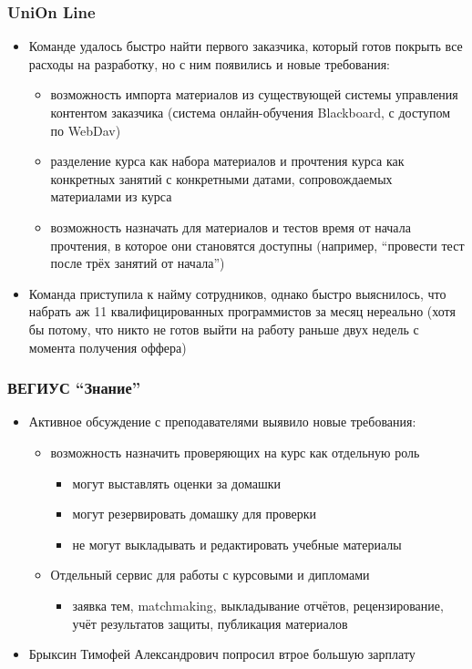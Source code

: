 \documentclass[xetex,mathserif,serif]{beamer}
\begin{document}
	\begin{frame}
		\frametitle{UniOn Line}
		\begin{itemize}
			\item Команде удалось быстро найти первого заказчика, который готов покрыть все расходы на разработку, но с ним появились и новые требования:
			\begin{itemize}
				\item возможность импорта материалов из существующей системы управления контентом заказчика (система онлайн-обучения Blackboard, с доступом по WebDav)
				\item разделение курса как набора материалов и прочтения курса как конкретных занятий с конкретными датами, сопровождаемых материалами из курса
				\item возможность назначать для материалов и тестов время от начала прочтения, в которое они становятся доступны (например, ``провести тест после трёх занятий от начала'')
			\end{itemize}
			\item Команда приступила к найму сотрудников, однако быстро выяснилось, что набрать аж 11 квалифицированных программистов за месяц нереально (хотя бы потому, что никто не готов выйти на работу раньше двух недель с момента получения оффера)
		\end{itemize}
	\end{frame}

	\begin{frame}
		\frametitle{ВЕГИУС ``Знание''}
		\begin{itemize}
			\item Активное обсуждение с преподавателями выявило новые требования:
			\begin{itemize}
				\item возможность назначить проверяющих на курс как отдельную роль
				\begin{itemize}
					\item могут выставлять оценки за домашки
					\item могут резервировать домашку для проверки
					\item не могут выкладывать и редактировать учебные материалы
				\end{itemize}
				\item Отдельный сервис для работы с курсовыми и дипломами
				\begin{itemize}
					\item заявка тем, matchmaking, выкладывание отчётов, рецензирование, учёт результатов защиты, публикация материалов
				\end{itemize}
			\end{itemize}
			\item Брыксин Тимофей Александрович попросил втрое большую зарплату
		\end{itemize}
	\end{frame}
\end{document}
